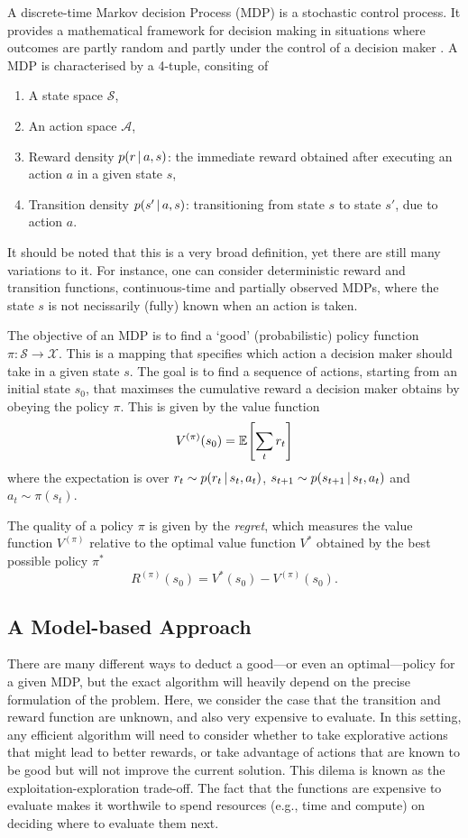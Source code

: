 A discrete-time Markov decision Process (MDP) is a stochastic control process. It provides a mathematical framework for decision making in situations where outcomes are partly random and partly under the control of a decision maker \citep{sutton2018reinforcement}. A MDP is characterised by a 4-tuple, consiting of
\begin{enumerate}
    \item A state space $\mathcal{S}$,
    \item An action space $\mathcal{A}$,
    \item Reward density $p(r \,|\, a, s)$: the immediate reward obtained after executing an action $a$ in a given state $s$,
    \item Transition density $p(s' \,|\, a, s)$: transitioning from state $s$ to state $s'$, due to action $a$.
\end{enumerate}
It should be noted that this is a very broad definition, yet there are still many variations to it. For instance, one can consider deterministic reward and transition functions, continuous-time and partially observed MDPs, where the state $s$ is not necissarily (fully) known when an action is taken.

The objective of an MDP is to find a `good' (probabilistic) policy function $\pi:\mathcal{S} \rightarrow \mathcal{X}$. This is a mapping that specifies which action a decision maker should take in a given state $s$. The goal is to find a sequence of actions, starting from an initial state $s_0$, that maximses the cumulative reward a decision maker obtains by obeying the policy $\pi$. This is given by the value function
\begin{equation}
    V^{(\pi)}(s_0) = \Exp{}{\sum_t r_t}
\end{equation}
where the expectation is over $r_t \sim p(r_t \,|\, s_t, a_t)$, $s_{t+1} \sim p(s_{t+1} \,|\, s_t, a_t)$ and $a_t \sim \pi(s_t)$.

The quality of a policy $\pi$ is given by the \emph{regret}, which measures the value function $V^{(\pi)}$ relative to the optimal value function $V^{*}$ obtained by the best possible policy $\pi^*$
\begin{equation}
    R^{(\pi)}(s_0) = V^*(s_0) - V^{(\pi)}(s_0). 
\end{equation}

\subsection{A Model-based Approach}
There are many different ways to deduct a good---or even an optimal---policy for a given MDP, but the exact algorithm will heavily depend on the precise formulation of the problem. Here, we consider the case that the transition and reward function are unknown, and also very expensive to evaluate. In this setting, any efficient algorithm will need to consider whether to take explorative actions that might lead to better rewards, or take advantage of actions that are known to be good but will not improve the current solution. This dilema is known as the exploitation-exploration trade-off. The fact that the functions are expensive to evaluate makes it worthwile to spend resources (e.g., time and compute) on deciding where to evaluate them next.


